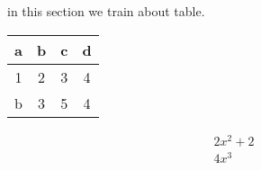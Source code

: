 \documentclass[12pt]{article}
\begin{document}
	in this section we train about table.
	
	\begin{tabular}{|c|c|c|c|}
		\hline		
		a & b & c & d \\ \hline
		1 & 2 & 3 & 4 \\ \hline
		b & 3 & 5 & 4
	\end{tabular}
	
	\begin{eqnarray}
		2x^2 + 2 \\
		4x^3
	\end{eqnarray}
\end{document}
